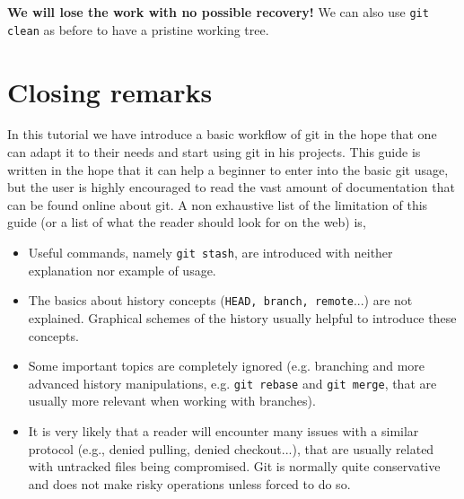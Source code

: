 \documentclass[a4paper,10pt]{article}
\begin{document}
\textbf{We will lose the work with no possible recovery!} We can also use \texttt{git clean} as before to have a pristine working tree.

\clearpage

\section{Closing remarks}

In this tutorial we have introduce a basic workflow of git in the hope that one can adapt it to their needs and start using git in his projects. This guide is written in the hope that it can help a beginner to enter into the basic git usage, but the user is highly encouraged to read the vast amount of documentation that can be found online about git. A non exhaustive list of the limitation of this guide (or a list of what the reader should look for on the web) is,

\begin{itemize}
 \item Useful commands, namely \texttt{git stash}, are introduced with neither explanation nor example of usage.
 \item The basics about history concepts (\texttt{HEAD, branch, remote}...) are not explained. Graphical schemes of the history usually helpful to introduce these concepts.
 \item Some important topics are completely ignored (e.g. branching and more advanced history manipulations, e.g. \texttt{git rebase} and \texttt{git merge}, that are usually more  relevant when working with branches).
 \item It is very likely that a reader will encounter many issues with a similar protocol (e.g., denied pulling, denied checkout...), that are usually related with untracked files being compromised. Git is normally quite conservative and does not make risky operations unless forced to do so.
\end{itemize}
\end{document}
